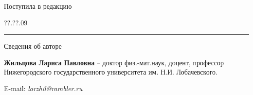 \documentclass[10pt]{article}
\begin{document}
{\small \vspace{\baselineskip} \hfill {Поступила в редакцию}
\par \hskip268pt {??.??.09}
\par
\vspace{\baselineskip}\hrule \vspace{3pt}
\par
Сведения об авторе
\par
{\bf Жильцова Лариса Павловна} -- доктор физ.-мат.наук, доцент,
профессор Нижегородского государственного университета им. Н.И. Лобачевского.
\par
E-mail: {\it larzhil@rambler.ru} }
\end{document}
